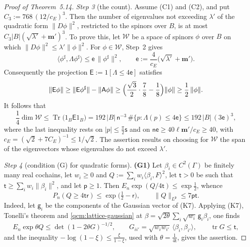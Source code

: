 \documentclass[11pt,letterpaper,reqno]{amsart}
\theoremstyle{definition}
\begin{document}
\begin{proof}[Proof of Theorem~5.14]
\emph{Step 3} (the count).
Assume (C1) and (C2), and put $C_3:=768\,(12/c_E)^3$.
Then the number of eigenvalues not exceeding $\lambda'$ of the quadratic form $\|D\phi\|^2$, restricted to the spinors over $B$, is at most $C_3|B|(\sqrt{\lambda'}+\mathbf m')^3$.
To prove this, let $\mathcal W$ be a space of spinors $\phi$ over $B$ on which $\|D\phi\|^2\le\lambda'\|\phi\|^2$.
For $\phi\in\mathcal W$, Step~2 gives
\begin{equation*}
\langle\phi^\sharp,\Lambda\phi^\sharp\rangle\le\mathsf e\,\|\phi^\sharp\|^2,\qquad\mathsf e:=\frac{4}{c_E}\bigl(\sqrt{\lambda'}+\mathbf m'\bigr).
\end{equation*}
Consequently the projection $\mathsf E:=1[\Lambda\le4\mathsf e]$ satisfies
\begin{equation*}
\|\mathsf E\phi\|\ge\|\mathsf E\phi^\sharp\|-\|\mathsf A\phi\|\ge\Bigl(\frac{\sqrt3}{2}\cdot\frac78-\frac18\Bigr)\|\phi\|\ge\frac12\,\|\phi\|.
\end{equation*}
It follows that
\begin{equation*}
\frac14\dim\mathcal W\le\operatorname{Tr}\bigl(1_B\mathsf E1_B\bigr)=192\,|B|\,\mathsf n^{-3}\,\#\{p:\Lambda(p)\le4\mathsf e\}\le192\,|B|\,(3\mathsf e)^3,
\end{equation*}
where the last inequality rests on $|p|\le\frac\pi2\mathsf s$ and on $\mathsf n\mathsf e\ge40\ell\mathbf m'/c_E\ge40$, with $c_E=(\sqrt2+7C_E)^{-1}\le1/\sqrt2$.
The assertion results on choosing for $\mathcal W$ the span of the eigenvectors whose eigenvalues do not exceed $\lambda'$.

\emph{Step 4} (condition (G) for quadratic forms).
\textbf{(G1)} Let $\beta_i\in C^2(\Gamma)$ be finitely many real cochains, let $w_i\ge0$ and $Q:=\sum_iw_i\langle\beta_i,F\rangle^2$, let $\mathsf t>0$ be such that $\mathsf t\ge\sum_iw_i\|\beta_i\|^2$, and let $\mathsf p\ge1$.
Then $E_n\exp(Q/4\mathsf t)\le\exp\frac12$, whence
\begin{equation*}
P_n(Q\ge4\mathsf t\mathsf r)\le\exp\bigl(\tfrac12-\mathsf r\bigr),\qquad\|Q\|_{L^{\mathsf p}}\le7\mathsf p\mathsf t.
\end{equation*}
Indeed, let $\mathsf g_i$ be the components of the Gaussian vector of (K7).
Applying (K7), Tonelli's theorem and \eqref{qcm:lattice-gaussian} at $\beta=\sqrt{2\theta}\sum_i\sqrt{w_i}\,\mathsf g_i\beta_i$, one finds
\begin{equation*}
E_n\exp\theta Q\le\det(1-2\theta G)^{-1/2},\qquad G_{ii'}=\sqrt{w_iw_{i'}}\,\langle\beta_i,\beta_{i'}\rangle,\qquad\operatorname{tr}G\le\mathsf t,
\end{equation*}
and the inequality $-\log(1-\xi)\le\frac{\xi}{1-\xi}$, used with $\theta=\frac1{4\mathsf t}$, gives the assertion.


\end{proof}
\end{document}
